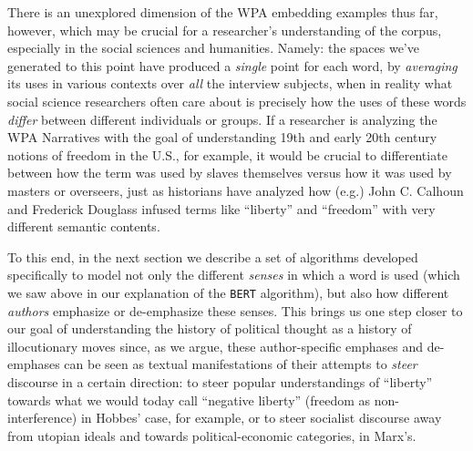 \documentclass[11pt]{article}
\newcommand{\BERT}[0]{\texttt{BERT}}
\begin{document}
There is an unexplored dimension of the WPA embedding examples thus far, however, which may be crucial for a researcher's understanding of the corpus, especially in the social sciences and humanities. Namely: the spaces we've generated to this point have produced a \textit{single} point for each word, by \textit{averaging} its uses in various contexts over \textit{all} the interview subjects, when in reality what social science researchers often care about is precisely how the uses of these words \textit{differ} between different individuals or groups. If a researcher is analyzing the WPA Narratives with the goal of understanding 19th and early 20th century notions of freedom in the U.S., for example, it would be crucial to differentiate between how the term was used by slaves themselves versus how it was used by masters or overseers, just as historians have analyzed how (e.g.) John C. Calhoun and Frederick Douglass infused terms like ``liberty'' and ``freedom'' with very different semantic contents.

To this end, in the next section we describe a set of algorithms developed specifically to model not only the different \textit{senses} in which a word is used (which we saw above in our explanation of the \BERT{} algorithm), but also how different \textit{authors} emphasize or de-emphasize these senses. This brings us one step closer to our goal of understanding the history of political thought as a history of illocutionary moves since, as we argue, these author-specific emphases and de-emphases can be seen as textual manifestations of their attempts to \textit{steer} discourse in a certain direction: to steer popular understandings of ``liberty'' towards what we would today call ``negative liberty'' (freedom as non-interference) in Hobbes' case, for example, or to steer socialist discourse away from utopian ideals and towards political-economic categories, in Marx's.

\end{document}
